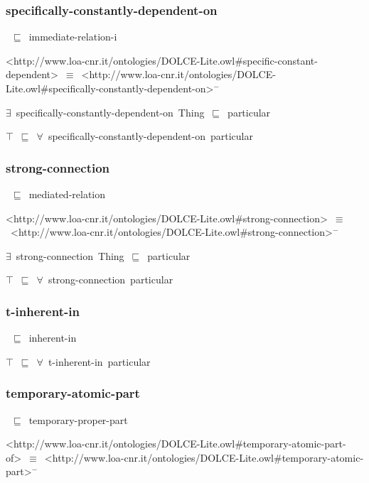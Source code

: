 \documentclass{article}
\begin{document}
\subsubsection*{specifically-constantly-dependent-on}

~\ensuremath{\sqsubseteq}~immediate-relation-i

<http://www.loa-cnr.it/ontologies/DOLCE-Lite.owl#specific-constant-dependent>~\ensuremath{\equiv}~<http://www.loa-cnr.it/ontologies/DOLCE-Lite.owl#specifically-constantly-dependent-on>\ensuremath{^-}

\ensuremath{\exists}~specifically-constantly-dependent-on~Thing~\ensuremath{\sqsubseteq}~particular

\ensuremath{\top}~\ensuremath{\sqsubseteq}~\ensuremath{\forall}~specifically-constantly-dependent-on~particular

\subsubsection*{strong-connection}

~\ensuremath{\sqsubseteq}~mediated-relation

<http://www.loa-cnr.it/ontologies/DOLCE-Lite.owl#strong-connection>~\ensuremath{\equiv}~<http://www.loa-cnr.it/ontologies/DOLCE-Lite.owl#strong-connection>\ensuremath{^-}

\ensuremath{\exists}~strong-connection~Thing~\ensuremath{\sqsubseteq}~particular

\ensuremath{\top}~\ensuremath{\sqsubseteq}~\ensuremath{\forall}~strong-connection~particular

\subsubsection*{t-inherent-in}

~\ensuremath{\sqsubseteq}~inherent-in

\ensuremath{\top}~\ensuremath{\sqsubseteq}~\ensuremath{\forall}~t-inherent-in~particular

\subsubsection*{temporary-atomic-part}

~\ensuremath{\sqsubseteq}~temporary-proper-part

<http://www.loa-cnr.it/ontologies/DOLCE-Lite.owl#temporary-atomic-part-of>~\ensuremath{\equiv}~<http://www.loa-cnr.it/ontologies/DOLCE-Lite.owl#temporary-atomic-part>\ensuremath{^-}
\end{document}
